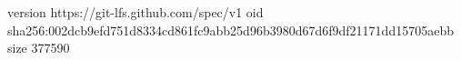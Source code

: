 version https://git-lfs.github.com/spec/v1
oid sha256:002dcb9efd751d8334cd861fc9abb25d96b3980d67d6f9df21171dd15705aebb
size 377590
